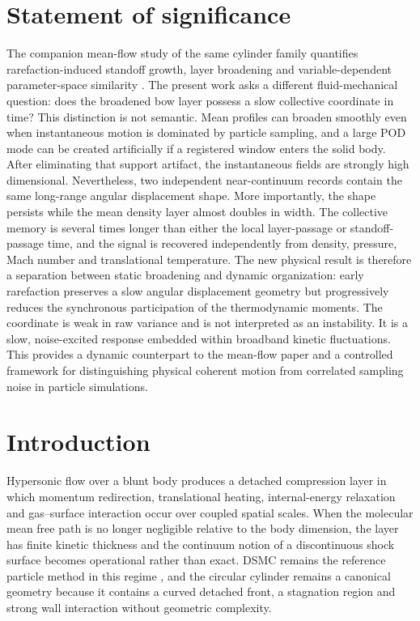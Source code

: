 \documentclass[paper]{JFM-FLM_Au}
\begin{document}
\section*{Statement of significance}
The companion mean-flow study of the same cylinder family quantifies rarefaction-induced standoff growth, layer broadening and variable-dependent parameter-space similarity \citep{RoohiShoja2026Mean}. The present work asks a different fluid-mechanical question: does the broadened bow layer possess a slow collective coordinate in time? This distinction is not semantic. Mean profiles can broaden smoothly even when instantaneous motion is dominated by particle sampling, and a large POD mode can be created artificially if a registered window enters the solid body. After eliminating that support artifact, the instantaneous fields are strongly high dimensional. Nevertheless, two independent near-continuum records contain the same long-range angular displacement shape. More importantly, the shape persists while the mean density layer almost doubles in width. The collective memory is several times longer than either the local layer-passage or standoff-passage time, and the signal is recovered independently from density, pressure, Mach number and translational temperature. The new physical result is therefore a separation between static broadening and dynamic organization: early rarefaction preserves a slow angular displacement geometry but progressively reduces the synchronous participation of the thermodynamic moments. The coordinate is weak in raw variance and is not interpreted as an instability. It is a slow, noise-excited response embedded within broadband kinetic fluctuations. This provides a dynamic counterpart to the mean-flow paper and a controlled framework for distinguishing physical coherent motion from correlated sampling noise in particle simulations.

\section{Introduction}
Hypersonic flow over a blunt body produces a detached compression layer in which momentum redirection, translational heating, internal-energy relaxation and gas--surface interaction occur over coupled spatial scales. When the molecular mean free path is no longer negligible relative to the body dimension, the layer has finite kinetic thickness and the continuum notion of a discontinuous shock surface becomes operational rather than exact. DSMC remains the reference particle method in this regime \citep{Bird1994,Lofthouse2007}, and the circular cylinder remains a canonical geometry because it contains a curved detached front, a stagnation region and strong wall interaction without geometric complexity.
\end{document}
